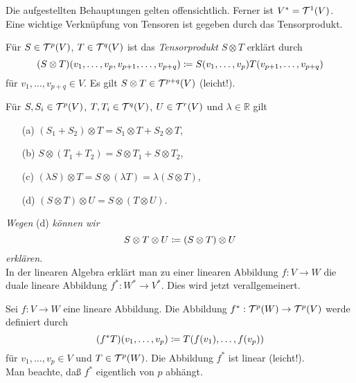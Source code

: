 \documentclass[a4paper,twoside,DIV15,BCOR12mm]{scrbook}
\begin{document}
\noindent
Die aufgestellten Behauptungen gelten offensichtlich. Ferner ist 
$V^{*} = {\cal T}^{1}(V)$.\\

\noindent
Eine wichtige Verknüpfung von Tensoren ist gegeben durch das Tensorprodukt.

\bigskip

 Für $S \in {\cal T}^{p}(V)$, $T \in 
{\cal T}^{q}(V)$ ist das {\em Tensorprodukt} $S \otimes T$ erklärt durch
\[ (S \otimes T)(v_{1},\dots,v_{p},v_{p+1},\dots,v_{p+q}) \da  
S(v_{1},\dots,v_{p})T(v_{p+1},\dots,v_{p+q}) \]
für $v_{1},\dots,v_{p+q} \in V$. Es gilt $S \otimes T \in {\cal 
T}^{p+q}(V)$ (leicht!).

\bigskip

\begin{satz}\label{Satz3.3.1} {Für $S, S_{i} \in {\cal T}^{p}(V)$, 
$T, T_{i} \in {\cal T}^{q}(V)$, $U \in {\cal T}^{r}(V)$ und $\lambda 
\in {\mathbb R}$ gilt}
\begin{enumerate}
\item[{\rm (a)}] $(S_{1} + S_{2}) \otimes T = S_{1} \otimes T + S_{2} \otimes T$,
\item[{\rm (b)}] $S \otimes (T_{1} + T_{2}) = S \otimes T_{1} + S \otimes T_{2}$,
\item[{\rm (c)}] $(\lambda S) \otimes T = S \otimes (\lambda T) = \lambda(S 
\otimes T)$,
\item[{\rm (d)}] $(S \otimes T) \otimes U = S \otimes (T \otimes U)$.
\end{enumerate}
\end{satz}

\noindent
{\em Wegen} (d) {\em können wir
\[ S \otimes T \otimes U \da  (S \otimes T) \otimes U \]
erklären.}\\

\noindent
In der linearen Algebra erklärt man zu einer linearen Abbildung $f: 
V \to W$ die duale lineare Abbildung $f^{*}: W^{*} \to V^{*}$. Dies 
wird jetzt verallgemeinert.

\bigskip

 Sei $f: V \to W$ eine lineare Abbildung. 
Die Abbildung $f^{*}: {\cal T}^{p}(W) \to {\cal T}^{p}(V)$ werde 
definiert durch
\[ (f^{*}T)(v_{1},\dots,v_{p}) \da  T(f(v_{1}),\dots,f(v_{p})) \]
für $v_{1},\dots,v_{p} \in V$ und $T \in {\cal T}^{p}(W)$. Die 
Abbildung $f^{*}$ ist linear (leicht!).\\

\noindent
Man beachte, daß $f^{*}$ eigentlich von $p$ abhängt.\\
\end{document}
